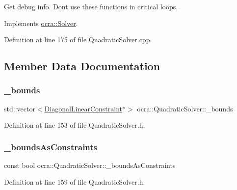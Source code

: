Get debug info. Don\textquotesingle{}t use these functions in critical loops. 

Implements \hyperlink{classocra_1_1Solver_ab3783d1c208500bfb1daa3e1abf34146}{ocra\+::\+Solver}.



Definition at line 175 of file Quadratic\+Solver.\+cpp.



\subsection{Member Data Documentation}
\hypertarget{classocra_1_1QuadraticSolver_a5d2a0ca5a490f8c210780f281f0961e3}{}\label{classocra_1_1QuadraticSolver_a5d2a0ca5a490f8c210780f281f0961e3} 
\subsubsection{\texorpdfstring{\+\_\+bounds}{\_bounds}}
{\footnotesize\ttfamily std\+::vector$<$\hyperlink{namespaceocra_ab310e2c53f5e52ec3aba0a832f7dc79e}{Diagonal\+Linear\+Constraint}$\ast$$>$ ocra\+::\+Quadratic\+Solver\+::\+\_\+bounds\hspace{0.3cm}{\ttfamily [protected]}}



Definition at line 153 of file Quadratic\+Solver.\+h.

\hypertarget{classocra_1_1QuadraticSolver_aad4e1bd8a751c4e827d5a637b1c2e9fb}{}\label{classocra_1_1QuadraticSolver_aad4e1bd8a751c4e827d5a637b1c2e9fb} 
\subsubsection{\texorpdfstring{\+\_\+bounds\+As\+Constraints}{\_boundsAsConstraints}}
{\footnotesize\ttfamily const bool ocra\+::\+Quadratic\+Solver\+::\+\_\+bounds\+As\+Constraints\hspace{0.3cm}{\ttfamily [protected]}}



Definition at line 159 of file Quadratic\+Solver.\+h.

